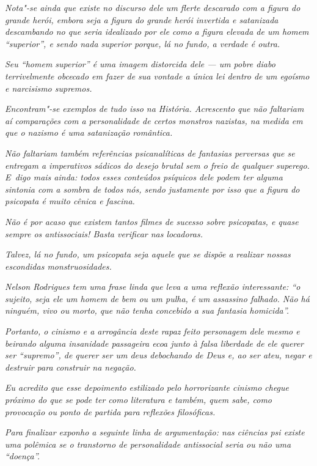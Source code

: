 \emph{Nota"-se ainda que existe no discurso dele um flerte descarado com
a figura do grande herói, embora seja a figura do grande herói invertida
e satanizada descambando no que seria idealizado por ele como a figura
elevada de um homem ``superior'', e sendo nada superior porque, lá no
fundo, a verdade é outra.}

\emph{Seu ``homem superior'' é uma imagem distorcida dele --- um pobre
diabo terrivelmente obcecado em fazer de sua vontade a única lei dentro
de um egoísmo e narcisismo supremos.}

\emph{Encontram"-se exemplos de tudo isso na História. Acrescento que não
faltariam aí comparações com a personalidade de certos monstros
nazistas, na medida em que o nazismo é uma satanização romântica.}

\emph{Não faltariam também referências psicanalíticas de fantasias
perversas que se entregam a imperativos sádicos do desejo brutal sem o
freio de qualquer superego. E~digo mais ainda: todos esses conteúdos
psíquicos dele podem ter alguma sintonia com a sombra de todos nós,
sendo justamente por isso que a figura do psicopata é muito cênica e
fascina.}

\emph{Não é por acaso que existem tantos filmes de sucesso sobre
psicopatas, e quase sempre os antissociais! Basta verificar nas
locadoras.}

\emph{Talvez, lá no fundo, um psicopata seja aquele que se dispõe a
realizar nossas escondidas monstruosidades.}

\emph{Nelson Rodrigues tem uma frase linda que leva a uma reflexão
interessante: ``o sujeito, seja ele um homem de bem ou um pulha, é um
assassino falhado. Não há ninguém, vivo ou morto, que não tenha
concebido a sua fantasia homicida''.}

\emph{Portanto, o cinismo e a arrogância deste rapaz feito personagem
dele mesmo e beirando alguma insanidade passageira ecoa junto à falsa
liberdade de ele querer ser ``supremo'', de querer ser um deus
debochando de Deus e, ao ser ateu, negar e destruir para construir na
negação.}

\emph{Eu acredito que esse depoimento estilizado pelo horrorizante
cinismo chegue próximo do que se pode ter como literatura e também, quem
sabe, como provocação ou ponto de partida para reflexões filosóficas.}

\emph{Para finalizar exponho a seguinte linha de argumentação: nas
ciências psi existe uma polêmica se o transtorno de personalidade
antissocial seria ou não uma ``doença''.}

